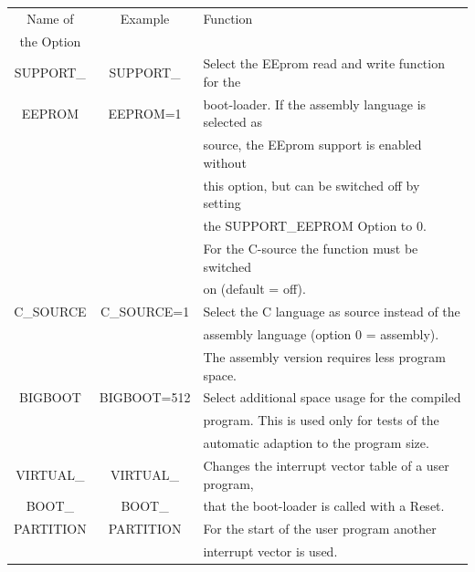 \begin{table}[H]
  \begin{center}
    \begin{tabular}{| c | c | l |}
    \hline
   Name of        & Example        & Function                                            \\
   the Option     &                &                                                     \\
    \hline
    \hline
    SUPPORT\_      & SUPPORT\_      & Select the EEprom read and write function for the  \\
    EEPROM         &  EEPROM=1      & boot-loader. If the assembly language is selected as \\
                   &                & source, the EEprom support is enabled without  \\
                   &                & this option, but can be switched off by setting \\
                   &                & the SUPPORT\_EEPROM Option to 0. \\
                   &                & For the C-source the function must be switched \\
                   &                & on (default = off). \\
    \hline
 C\_SOURCE         & C\_SOURCE=1    & Select the C language as source instead of the  \\
                   &                & assembly language (option 0 = assembly).\\
                   &                & The assembly version requires less program space. \\
    \hline
 BIGBOOT           & BIGBOOT=512    & Select additional space usage for the compiled \\
                   &                & program. This is used only for tests of the \\
                   &                & automatic adaption to the program size. \\
    \hline
VIRTUAL\_          & VIRTUAL\_       & Changes the interrupt vector table of a user program, \\
 BOOT\_            & BOOT\_          & that the boot-loader is called with a Reset. \\
 PARTITION         & PARTITION       & For the start of the user program another \\
		   &                 & interrupt vector is used.          \\

\end{tabular}
\end{center}
\end{table}
